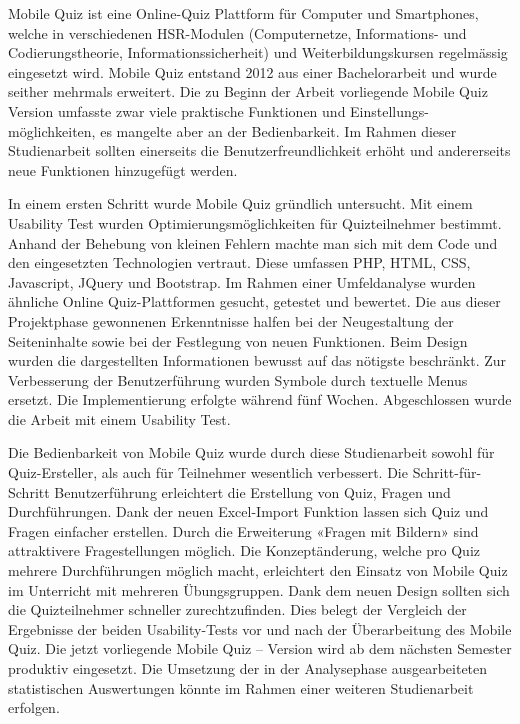 

Mobile Quiz ist eine Online-Quiz Plattform für Computer und Smartphones, welche in verschiedenen HSR-Modulen (Computernetze, Informations- und Codierungstheorie, Informationssicherheit) und Weiterbildungskursen regelmässig eingesetzt wird. Mobile Quiz entstand 2012 aus einer Bachelorarbeit und wurde seither mehrmals erweitert. Die zu Beginn der Arbeit vorliegende Mobile Quiz Version umfasste zwar viele praktische Funktionen und Einstellungs-möglichkeiten, es mangelte aber an der Bedienbarkeit. Im Rahmen dieser Studienarbeit sollten einerseits die Benutzerfreundlichkeit erhöht und andererseits neue Funktionen hinzugefügt werden.

\bigskip

In einem ersten Schritt wurde Mobile Quiz gründlich untersucht. Mit einem Usability Test wurden Optimierungsmöglichkeiten für Quizteilnehmer bestimmt. Anhand der Behebung von kleinen Fehlern machte man sich mit dem Code und den eingesetzten Technologien vertraut. Diese umfassen PHP, HTML, CSS, Javascript, JQuery und Bootstrap. Im Rahmen einer Umfeldanalyse wurden ähnliche Online Quiz-Plattformen gesucht, getestet und bewertet. Die aus dieser Projektphase gewonnenen Erkenntnisse halfen bei der Neugestaltung der Seiteninhalte sowie bei der Festlegung von neuen Funktionen. Beim Design wurden die dargestellten Informationen bewusst auf das nötigste beschränkt. Zur Verbesserung der Benutzerführung wurden Symbole durch textuelle Menus ersetzt. Die Implementierung erfolgte während fünf Wochen. Abgeschlossen wurde die Arbeit mit einem Usability Test. 

\bigskip


Die Bedienbarkeit von Mobile Quiz wurde durch diese Studienarbeit sowohl für Quiz-Ersteller, als auch für Teilnehmer wesentlich verbessert. Die Schritt-für-Schritt Benutzerführung erleichtert die Erstellung von Quiz, Fragen und Durchführungen. Dank der neuen Excel-Import Funktion lassen sich Quiz und Fragen einfacher erstellen. Durch die Erweiterung «Fragen mit Bildern» sind attraktivere Fragestellungen möglich. Die Konzeptänderung, welche pro Quiz mehrere Durchführungen möglich macht, erleichtert den Einsatz von Mobile Quiz im Unterricht mit mehreren Übungsgruppen. Dank dem neuen Design sollten sich die Quizteilnehmer schneller zurechtzufinden. Dies belegt der Vergleich der Ergebnisse der beiden Usability-Tests vor und nach der Überarbeitung des Mobile Quiz.  
Die jetzt vorliegende Mobile Quiz – Version wird ab dem nächsten Semester produktiv eingesetzt. Die Umsetzung der in der Analysephase ausgearbeiteten statistischen Auswertungen könnte im Rahmen einer weiteren Studienarbeit erfolgen. 
